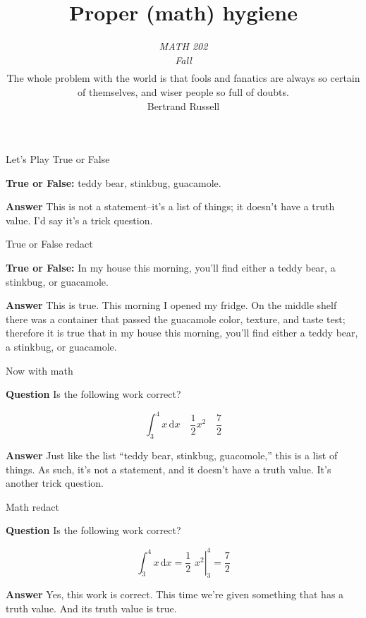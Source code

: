 \documentclass[fleqn]{beamer}
\subtitle{\emph{MATH 202} \\ \emph{Fall \the\year}  \\ $\phantom{xxx}$ \\ The whole problem with the world is that fools and fanatics are always so certain of themselves, and wiser people so full of doubts. \\ \vspace{0.25in} Bertrand Russell}
\title{\textbf{Proper (math) hygiene}}
\date{}
\theoremstyle{definition}
\begin{document}
\frame{\titlepage}

\begin{frame}{Let's Play True or False}

    \textbf{True or False:} teddy bear, stinkbug, guacamole.

    \vspace{0.5in}
    \textbf{Answer} This is not a statement--it's a list of things; it doesn't 
    have a truth value. I'd say it's a trick question.

\vfill 
\end{frame}

\begin{frame}{True or False redact}

  \textbf{True or False:} In my house this morning, you'll 
  find either a teddy bear, a stinkbug, or guacamole.

  \vspace{0.5in}
  \textbf{Answer} This is true. This morning I opened my fridge. On the
  middle shelf there was a container that passed the guacamole color,
  texture, and taste test; therefore it is true that in my house this morning, you'll 
  find either a teddy bear, a stinkbug, or guacamole.

\vfill 
\end{frame}

\begin{frame}{Now with math}

  \textbf{Question} Is the following work correct?

  \begin{equation*}
    \int_3^4 x \, \mathrm{d}x \quad 
     \frac{1}{2} x^{2} \quad \frac{7}{2}
  \end{equation*}

  \vspace{0.5in}
  \textbf{Answer} Just like the list ``teddy bear, stinkbug, 
  guacomole,''
  this is a list of things. As such, it's not 
  a statement, and it doesn't have a truth value. It's another trick 
  question.
  \vfill 
\end{frame}

\begin{frame}{Math redact}

  \textbf{Question} Is the following work correct?

  \begin{equation*}
    \int_3^4 x \, \mathrm{d}x =
     \left. \frac{1}{2} \,\, x^{2} \right |_{3}^4 = \frac{7}{2}
  \end{equation*}

  \vspace{0.5in}
  \textbf{Answer} Yes, this work is correct. This time we're 
  given something that has a truth value. And its truth value is
  true.

  \vfill
\end{frame}
\end{document}
